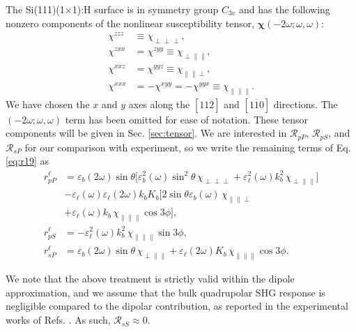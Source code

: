 \documentclass[prb,superscriptaddress,showpacs,twocolumn,letterpaper]{revtex4}
\begin{document}
The Si(111)(1$\times$1):H surface is in symmetry group $C_{3v}$ and has the
following nonzero components\cite{sipePRB87} of the nonlinear susceptibility
tensor, $\boldsymbol{\chi}(-2\omega;\omega,\omega)$:
\begin{align*}
\chi^{zzz}&\equiv\chi_{\perp\perp\perp},\nonumber\\
\chi^{zxx}&=\chi^{zyy}\equiv\chi_{\perp\parallel\parallel},\nonumber\\
\chi^{xxz}&=\chi^{yyz}\equiv\chi_{\parallel\parallel\perp},\nonumber\\
\chi^{xxx}&=-\chi^{xyy}=-\chi^{yyx}\equiv\chi_{\parallel\parallel\parallel}.
\end{align*}
We have chosen the $x$ and $y$ axes along the $[11\overline{2}]$ and
$[1\overline{1}0]$ directions. The $(-2\omega;\omega,\omega)$ term has been
omitted for ease of notation. These tensor components will be given in Sec.
\ref{sec:tensor}. We are interested in $\mathcal{R}_{pP}$, $\mathcal{R}_{pS}$,
and $\mathcal{R}_{sP}$ for our comparison with experiment, so we write the
remaining terms of Eq. \eqref{eq:r19} as
\begin{align}
r^{\ell}_{pP} &= \varepsilon_{b}(2\omega)\sin\theta
\bigl[\varepsilon^{2}_{b}(\omega)\sin^{2}\theta\,\chi_{\perp\perp\perp} 
+ \varepsilon^{2}_{\ell}(\omega)k^{2}_{b}\,\chi_{\perp\parallel\parallel}\bigr]
\nonumber\\
&- \varepsilon_{\ell}(\omega)\varepsilon_{\ell}(2\omega)
k_{b}K_{b}\bigl[2\sin\theta\varepsilon_{b}(\omega)
\,\chi_{\parallel\parallel\perp}\nonumber\\
& + \varepsilon_{\ell}(\omega)k_{b}
\,\chi_{\parallel\parallel\parallel}\cos3\phi\bigr],\label{eq:rpP}\\
r^{\ell}_{pS} &= -\varepsilon_\ell^2(\omega)k^2_{b}
        \,\chi_{\parallel\parallel\parallel}\sin3\phi,\label{eq:rpS}\\
r^{\ell}_{sP} &= \varepsilon_{b}(2\omega)\sin\theta
        \,\chi_{\perp\parallel\parallel}
        + \varepsilon_{\ell}(2\omega)K_{b}
        \,\chi_{\parallel\parallel\parallel}\cos3\phi.\label{eq:rsP}
\end{align}

We note that the above treatment is strictly valid within the dipole
approximation, and we assume that the bulk quadrupolar SHG response is
negligible compared to the dipolar contribution, as reported in the experimental
works of Refs. . As such, $\mathcal{R}_{sS} \approx 0$.
\end{document}
